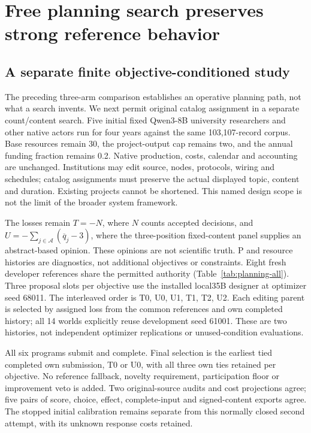 \section{Free planning search preserves strong reference behavior}
\label{sec:native-planning-search}
\subsection{A separate finite objective-conditioned study}
The preceding three-arm comparison establishes an operative planning path,
not what a search invents. We next permit original catalog assignment in a
separate count/content search. Five initial fixed Qwen3-8B university
researchers and other native actors run for four years against the same
103,107-record corpus. Base resources remain 30, the project-output cap remains
two, and the annual funding fraction remains 0.2. Native production, costs,
calendar and accounting are unchanged. Institutions may edit source, nodes,
protocols, wiring and schedules; catalog assignments must preserve the actual
displayed topic, content and duration. Existing projects cannot be shortened.
This named design scope is not the limit of the broader system framework.

The losses remain $T=-N$, where $N$ counts accepted decisions, and
$U=-\sum_{j\in\mathcal A}(\overline q_j-3)$, where the three-position
fixed-content panel supplies an abstract-based opinion. These opinions are
not scientific truth. P and resource histories are diagnostics, not additional
objectives or constraints. Eight fresh developer references share the permitted
authority (Table~\ref{tab:planning-all}). Three proposal slots per objective
use the installed local35B designer at optimizer seed 68011. The interleaved
order is T0, U0, U1, T1, T2, U2. Each editing parent is selected by assigned loss
from the common references and own completed history; all 14 worlds explicitly
reuse development seed 61001. These are two histories, not independent optimizer
replications or unused-condition evaluations.

All six programs submit and complete. Final selection is the earliest tied
completed own submission, T0 or U0, with all three own ties retained per
objective. No reference fallback, novelty requirement, participation floor
or improvement veto is added. Two original-source audits and cost projections
agree; five pairs of score, choice, effect, complete-input and signed-content
exports agree. The stopped initial calibration remains separate from this
normally closed second attempt, with its unknown response costs retained.

